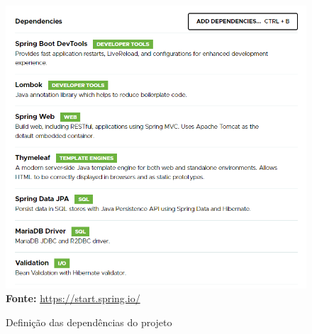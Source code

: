\FloatBarrier
\begin{figure}[!htbp]
    \centering
    \caption{Definição das dependências do projeto}
    \includegraphics[scale=0.7]{imagens/cap10SpringInitializrConfProjeto02}
    \\\textbf{Fonte:} \url{https://start.spring.io/}
    \label{fig:cap10SpringInitializrConfProjeto02}
\end{figure}
\FloatBarrier

